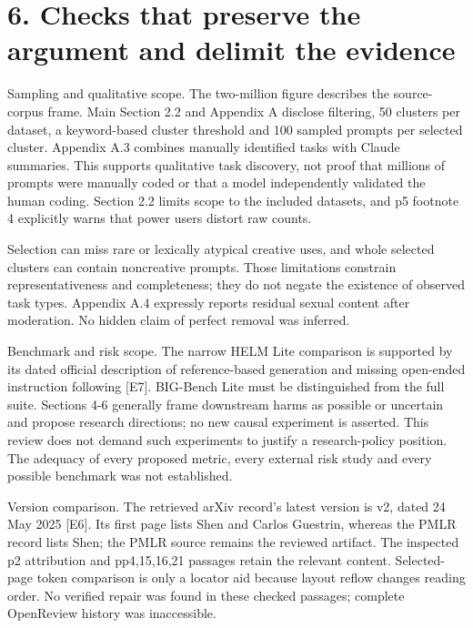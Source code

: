 \documentclass[10pt]{article}
\begin{document}
\section*{6. Checks that preserve the argument and delimit the evidence}
Sampling and qualitative scope. The two-million figure describes the source-corpus frame. Main Section 2.2 and Appendix A disclose filtering, 50 clusters per dataset, a keyword-based cluster threshold and 100 sampled prompts per selected cluster. Appendix A.3 combines manually identified tasks with Claude summaries. This supports qualitative task discovery, not proof that millions of prompts were manually coded or that a model independently validated the human coding. Section 2.2 limits scope to the included datasets, and p5 footnote 4 explicitly warns that power users distort raw counts.\par
Selection can miss rare or lexically atypical creative uses, and whole selected clusters can contain noncreative prompts. Those limitations constrain representativeness and completeness; they do not negate the existence of observed task types. Appendix A.4 expressly reports residual sexual content after moderation. No hidden claim of perfect removal was inferred.\par
Benchmark and risk scope. The narrow HELM Lite comparison is supported by its dated official description of reference-based generation and missing open-ended instruction following [E7]. BIG-Bench Lite must be distinguished from the full suite. Sections 4-6 generally frame downstream harms as possible or uncertain and propose research directions; no new causal experiment is asserted. This review does not demand such experiments to justify a research-policy position. The adequacy of every proposed metric, every external risk study and every possible benchmark was not established.\par
Version comparison. The retrieved arXiv record’s latest version is v2, dated 24 May 2025 [E6]. Its first page lists Shen and Carlos Guestrin, whereas the PMLR record lists Shen; the PMLR source remains the reviewed artifact. The inspected p2 attribution and pp4,15,16,21 passages retain the relevant content. Selected-page token comparison is only a locator aid because layout reflow changes reading order. No verified repair was found in these checked passages; complete OpenReview history was inaccessible.\par
\end{document}

